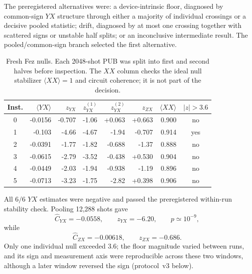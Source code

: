 \documentclass[aps,prl,reprint,superscriptaddress,nofootinbib]{revtex4-2}
\begin{document}
The preregistered alternatives were: a device-intrinsic floor, diagnosed by common-sign $YX$ structure through either a majority of individual crossings or a decisive pooled statistic; drift, diagnosed by at most one crossing together with scattered signs or unstable half splits; or an inconclusive intermediate result.  The pooled/common-sign branch selected the first alternative.

\begin{table}[t]
\caption{Fresh Fez nulls.  Each 2048-shot PUB was split into first and second halves before inspection.  The $XX$ column checks the ideal null stabilizer $\langle XX\rangle=1$ and circuit coherence; it is not part of the decision.}
\label{tab:fez-null-confirmation}
\begin{ruledtabular}
\begin{tabular}{crrrrrrc}
Inst. & $\langle YX\rangle$ & $z_{YX}$ & $z_{YX}^{(1)}$ & $z_{YX}^{(2)}$ & $z_{ZX}$ & $\langle XX\rangle$ & $|z|>3.6$\\
\hline
0 & -0.0156 & -0.707 & -1.06 & +0.063 & +0.663 & 0.900 & no\\
1 & -0.103 & -4.66 & -4.67 & -1.94 & -0.707 & 0.914 & yes\\
2 & -0.0391 & -1.77 & -1.82 & -0.688 & -1.37 & 0.888 & no\\
3 & -0.0615 & -2.79 & -3.52 & -0.438 & +0.530 & 0.904 & no\\
4 & -0.0449 & -2.03 & -1.94 & -0.938 & -1.19 & 0.896 & no\\
5 & -0.0713 & -3.23 & -1.75 & -2.82 & +0.398 & 0.906 & no\\
\end{tabular}
\end{ruledtabular}
\end{table}

All $6/6$ $YX$ estimates were negative and passed the preregistered within-run stability check.  Pooling 12,288 shots gave
\begin{equation}
 \widehat C_{YX}=-0.0558,
 \qquad z_{YX}=-6.20,
 \qquad p\simeq10^{-9},
 \label{eq:fez-pooled-yx}
\end{equation}
while
\begin{equation}
 \widehat C_{ZX}=-0.00618,
 \qquad z_{ZX}=-0.686.
 \label{eq:fez-pooled-zx}
\end{equation}
Only one individual null exceeded $3.6$; the floor magnitude varied between runs, and its sign and measurement axis were reproducible across these two windows, although a later window reversed the sign (protocol~v3 below).
\end{document}

